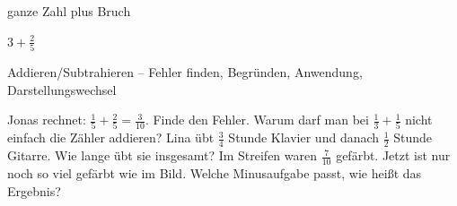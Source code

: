 \begin{aufgabe}{ganze Zahl plus Bruch}
\begin{teile}
\teil $3 + \frac{2}{5}$
\end{teile}
\end{aufgabe}

\begin{aufgabe}{Addieren/Subtrahieren – Fehler finden, Begründen, Anwendung, Darstellungswechsel}
\begin{teile}
\teil Jonas rechnet: $\frac{1}{5} + \frac{2}{5} = \frac{3}{10}$. Finde den Fehler.
\teil Warum darf man bei $\frac{1}{3} + \frac{1}{5}$ nicht einfach die Zähler addieren?
\teil Lina übt $\frac{3}{4}$ Stunde Klavier und danach $\frac{1}{2}$ Stunde Gitarre. Wie lange übt sie insgesamt?
\teil Im Streifen waren $\frac{7}{10}$ gefärbt. Jetzt ist nur noch so viel gefärbt wie im Bild. Welche Minusaufgabe passt, wie heißt das Ergebnis?

\leerfeld
\end{teile}
\end{aufgabe}
